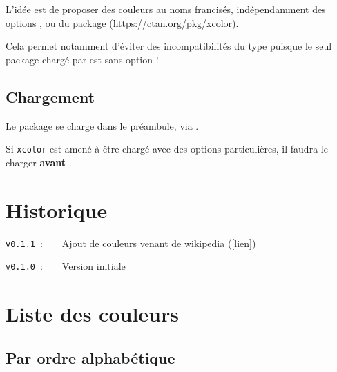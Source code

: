 \documentclass[french,11pt,a4paper]{article}
\begin{document}
L'idée est de proposer des couleurs au noms francisés, indépendamment des options \MontreCode{[table]}, \MontreCode{[svgnames]} ou \MontreCode{[dvipsnames]} du package  (\url{https://ctan.org/pkg/xcolor}).

\smallskip

Cela permet notamment d'éviter des incompatibilités du type  puisque le seul package chargé par  est  sans option !

\subsection{Chargement}

Le package se charge dans le préambule, via .

Si \texttt{xcolor} est amené à être chargé avec des options particulières, il faudra le charger \textbf{avant} .



\pagebreak

\section{Historique}

\verb|v0.1.1|~:~~~~Ajout de couleurs venant de wikipedia (\href{https://fr.wikipedia.org/wiki/Liste_de_noms_de_couleur}{[lien]})

\verb|v0.1.0|~:~~~~Version initiale

\section{Liste des couleurs}

\subsection{Par ordre alphabétique}
\end{document}
